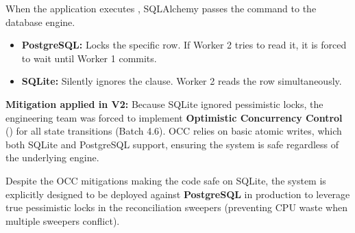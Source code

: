 When the application executes , SQLAlchemy passes the  command to the database engine.
\begin{itemize}
    \item \textbf{PostgreSQL:} Locks the specific row. If Worker 2 tries to read it, it is forced to wait until Worker 1 commits.
    \item \textbf{SQLite:} Silently ignores the  clause. Worker 2 reads the row simultaneously.
\end{itemize}

\textbf{Mitigation applied in V2:} Because SQLite ignored pessimistic locks, the engineering team was forced to implement \textbf{Optimistic Concurrency Control} () for all state transitions (Batch 4.6). OCC relies on basic atomic writes, which both SQLite and PostgreSQL support, ensuring the system is safe regardless of the underlying engine.

\begin{tcolorbox}[successbox={Production Readiness}]
Despite the OCC mitigations making the code safe on SQLite, the system is explicitly designed to be deployed against \textbf{PostgreSQL} in production to leverage true pessimistic locks in the reconciliation sweepers (preventing CPU waste when multiple sweepers conflict).
\end{tcolorbox}
